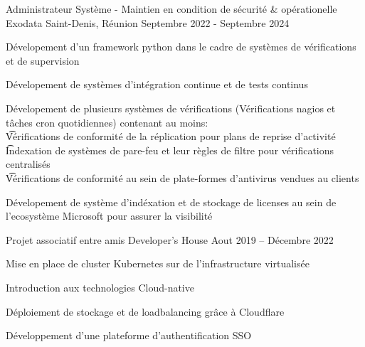 
\begin{cventries}
  \cventry
    {Administrateur Système - Maintien en condition de sécurité \& opérationelle}
    {Exodata}
    {Saint-Denis, Réunion}
    {Septembre 2022 - Septembre 2024}
    {
      \begin{cvitems}
       \item{Dévelopement d'un framework python dans le cadre de systèmes de vérifications et de supervision}
       \item{Dévelopement de systèmes d'intégration continue et de tests continus}
       \item{
        Dévelopement de plusieurs systèmes de vérifications (Vérifications nagios et tâches cron quotidiennes) contenant au moins: \\
        \t  * Vérifications de conformité de la réplication pour plans de reprise d'activité \\
        \t  * Indexation de systèmes de pare-feu et leur règles de filtre pour vérifications centralisés \\
        \t  * Vérifications de conformité au sein de plate-formes d'antivirus vendues au clients
        }
        \item{Dévelopement de système d'indéxation et de stockage de licenses au sein de l'ecosystème Microsoft pour assurer la visibilité}
      \end{cvitems}
    }
  \cventry
    {Projet associatif entre amis}
    {Developer's House}
    {}
    {Aout 2019 -- Décembre 2022}
    {
    \begin{cvitems}
      \item{Mise en place de cluster Kubernetes sur de l'infrastructure virtualisée}
      \item{Introduction aux technologies Cloud-native}
      \item{Déploiement de stockage et de loadbalancing grâce à Cloudflare}
      \item{Développement d'une plateforme d'authentification SSO}
    \end{cvitems}
    }
    
\end{cventries}
